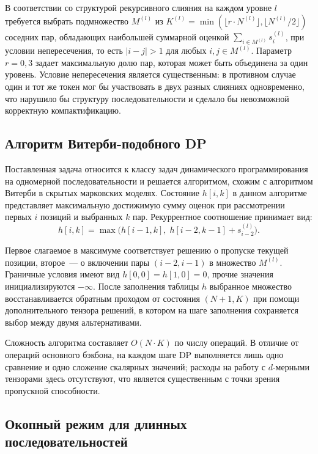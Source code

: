 В соответствии со структурой рекурсивного слияния на каждом уровне $l$
требуется выбрать подмножество $M^{(l)}$ из $K^{(l)} = \min(\lfloor r
\cdot N^{(l)} \rfloor, \lfloor N^{(l)} / 2 \rfloor)$ соседних пар,
обладающих наибольшей суммарной оценкой $\sum_{i \in M^{(l)}}
s_i^{(l)}$, при условии непересечения, то есть $|i - j| > 1$ для любых
$i, j \in M^{(l)}$. Параметр $r = 0{,}3$ задает максимальную долю пар,
которая может быть объединена за один уровень. Условие непересечения
является существенным: в противном случае один и тот же токен мог бы
участвовать в двух разных слияниях одновременно, что нарушило бы
структуру последовательности и сделало бы невозможной корректную
компактификацию.

\subsection{Алгоритм Витерби-подобного DP}

Поставленная задача относится к классу задач динамического
программирования на одномерной последовательности и решается
алгоритмом, схожим с алгоритмом Витерби в скрытых марковских моделях.
Состояние $h[i, k]$ в данном алгоритме представляет максимальную
достижимую сумму оценок при рассмотрении первых $i$ позиций и выбранных
$k$ пар. Рекуррентное соотношение принимает вид:
\begin{equation}
  h[i, k] = \max\!\big(h[i-1, k],\; h[i-2, k-1] + s_{i-2}^{(l)}\big).
  \label{eq:dp_recurrence}
\end{equation}

Первое слагаемое в максимуме соответствует решению о пропуске текущей
позиции, второе~--- о включении пары $(i-2, i-1)$ в множество
$M^{(l)}$. Граничные условия имеют вид $h[0, 0] = h[1, 0] = 0$, прочие
значения инициализируются $-\infty$. После заполнения таблицы $h$
выбранное множество восстанавливается обратным проходом от состояния
$(N + 1, K)$ при помощи дополнительного тензора решений, в котором на
шаге заполнения сохраняется выбор между двумя альтернативами.

Сложность алгоритма составляет $O(N \cdot K)$ по числу операций.
В отличие от операций основного бэкбона, на каждом шаге DP выполняется
лишь одно сравнение и одно сложение скалярных значений; расходы на
работу с $d$-мерными тензорами здесь отсутствуют, что является
существенным с точки зрения пропускной способности.

\subsection{Окопный режим для длинных последовательностей}

